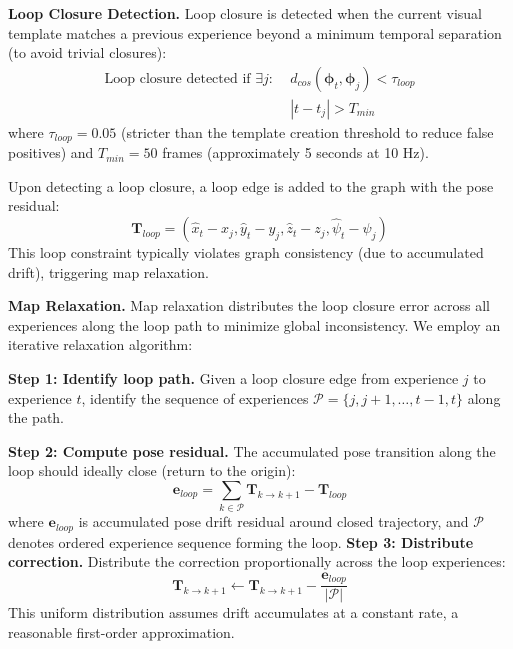 \textbf{Loop Closure Detection.} Loop closure is detected when the current visual template matches a previous experience beyond a minimum temporal separation (to avoid trivial closures):
\begin{equation}
    \begin{aligned}
        \text{Loop closure detected if } \exists j:\; & d_{cos}(\boldsymbol{\phi}_t, \boldsymbol{\phi}_j) < \tau_{loop} \\
                                                      & |t - t_j| > T_{min}
    \end{aligned}
\end{equation}
where $\tau_{loop} = 0.05$ (stricter than the template creation threshold to reduce false positives) and $T_{min} = 50$ frames (approximately 5 seconds at 10 Hz).

Upon detecting a loop closure, a loop edge is added to the graph with the pose residual:
\begin{equation}
    \mathbf{T}_{loop} = (\hat{x}_t - x_j, \hat{y}_t - y_j, \hat{z}_t - z_j, \hat{\psi}_t - \psi_j)
\end{equation}
This loop constraint typically violates graph consistency (due to accumulated drift), triggering map relaxation.

\textbf{Map Relaxation.} Map relaxation distributes the loop closure error across all experiences along the loop path to minimize global inconsistency. We employ an iterative relaxation algorithm:

\textbf{Step 1: Identify loop path.} Given a loop closure edge from experience $j$ to experience $t$, identify the sequence of experiences $\mathcal{P} = \{j, j+1, \ldots, t-1, t\}$ along the path.

\textbf{Step 2: Compute pose residual.} The accumulated pose transition along the loop should ideally close (return to the origin):
\begin{equation}
    \mathbf{e}_{loop} = \sum_{k \in \mathcal{P}} \mathbf{T}_{k \to k+1} - \mathbf{T}_{loop}
\end{equation}
where $\mathbf{e}_{loop}$ is accumulated pose drift residual around closed trajectory, and $\mathcal{P}$ denotes ordered experience sequence forming the loop.
\textbf{Step 3: Distribute correction.} Distribute the correction proportionally across the loop experiences:
\begin{equation}
    \mathbf{T}_{k \to k+1} \leftarrow \mathbf{T}_{k \to k+1} - \frac{\mathbf{e}_{loop}}{|\mathcal{P}|}
\end{equation}
This uniform distribution assumes drift accumulates at a constant rate, a reasonable first-order approximation.


